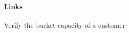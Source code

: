 \label{TC-101}
\paragraph{Links} 

\begin{testprocedure}
    \stage Verify the bucket capacity of a customer
\end{testprocedure}
